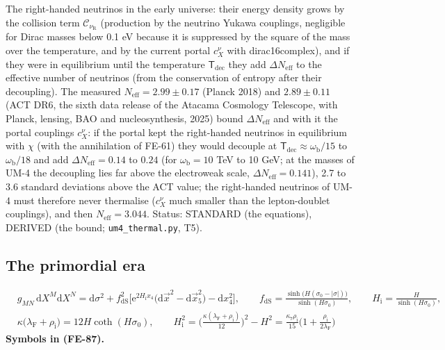 \documentclass[
  10pt,
]{article}
\begin{document}
The right-handed neutrinos in the early universe: their energy density
grows by the collision term \(\mathcal{C}_{\nu_{\mathrm{R}}}\)
(production by the neutrino Yukawa couplings, negligible for Dirac
masses below 0.1 eV because it is suppressed by the square of the mass
over the temperature, and by the current portal \(c^{\nu}_X\) with
dirac16complex), and if they were in equilibrium until the temperature
\(\mathsf{T}_{\mathrm{dec}}\) they add \(\Delta N_{\mathrm{eff}}\) to
the effective number of neutrinos (from the conservation of entropy
after their decoupling). The measured
\(N_{\mathrm{eff}} = 2.99 \pm 0.17\) (Planck 2018) and \(2.89 \pm 0.11\)
(ACT DR6, the sixth data release of the Atacama Cosmology Telescope,
with Planck, lensing, BAO and nucleosynthesis, 2025) bound
\(\Delta N_{\mathrm{eff}}\) and with it the portal couplings
\(c^{\nu}_X\): if the portal kept the right-handed neutrinos in
equilibrium with \(\chi\) (with the annihilation of FE-61) they would
decouple at \(\mathsf{T}_{\mathrm{dec}} \approx \omega_{\mathrm{b}}/15\)
to \(\omega_{\mathrm{b}}/18\) and add \(\Delta N_{\mathrm{eff}} = 0.14\)
to \(0.24\) (for \(\omega_{\mathrm{b}} = 10\) TeV to 10 GeV; at the
masses of UM-4 the decoupling lies far above the electroweak scale,
\(\Delta N_{\mathrm{eff}} = 0.141\)), 2.7 to 3.6 standard deviations
above the ACT value; the right-handed neutrinos of UM-4 must therefore
never thermalise (\(c^{\nu}_X\) much smaller than the lepton-doublet
couplings), and then \(N_{\mathrm{eff}} = 3.044\). Status: STANDARD (the
equations), DERIVED (the bound; \texttt{um4\_thermal.py}, T5).

\hypertarget{the-primordial-era}{%
\subsection{The primordial era}\label{the-primordial-era}}

\[
\begin{aligned}
&g_{MN}\,\mathrm{d}X^M\mathrm{d}X^N = \mathrm{d}\sigma^2 + f_{\mathrm{dS}}^2\Big[\mathrm{e}^{2H_{\mathrm{i}}x_4}\big(\mathrm{d}\vec x^2 - \mathrm{d}\vec x_5^2\big) - \mathrm{d}x_4^2\Big],\qquad
 f_{\mathrm{dS}} = \frac{\sinh\big(H(\sigma_0 - \lvert\sigma\rvert)\big)}{\sinh(H\sigma_0)},\qquad H_{\mathrm{i}} = \frac{H}{\sinh(H\sigma_0)},\\
&\kappa\big(\lambda_{\mathrm{F}} + \rho_{\mathrm{i}}\big) = 12H\coth(H\sigma_0),\qquad
 H_{\mathrm{i}}^2 = \Big(\frac{\kappa(\lambda_{\mathrm{F}} + \rho_{\mathrm{i}})}{12}\Big)^2 - H^2 = \frac{\kappa_7\rho_{\mathrm{i}}}{15}\Big(1 + \frac{\rho_{\mathrm{i}}}{2\lambda_{\mathrm{F}}}\Big)
\end{aligned} \tag{FE-87}
\] \textbf{Symbols in (FE-87).}
\end{document}
